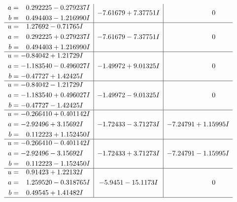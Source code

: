 \documentclass[1p]{elsarticle_modified}
\theoremstyle{definition}
\begin{document}
$$\begin{array}{c|c|c}
\begin{aligned}
a &= \phantom{-}0.292225 - 0.279237 I \\
b &= \phantom{-}0.494403 - 1.216990 I\end{aligned}
 & -7.61679 + 7.37751 I & \phantom{-0.000000 } 0 \\ \hline\begin{aligned}
u &= \phantom{-}1.27692 - 0.71765 I \\
a &= \phantom{-}0.292225 + 0.279237 I \\
b &= \phantom{-}0.494403 + 1.216990 I\end{aligned}
 & -7.61679 - 7.37751 I & \phantom{-0.000000 } 0 \\ \hline\begin{aligned}
u &= -0.84042 + 1.21729 I \\
a &= -1.183540 - 0.496027 I \\
b &= -0.47727 + 1.42425 I\end{aligned}
 & -1.49972 + 9.01325 I & \phantom{-0.000000 } 0 \\ \hline\begin{aligned}
u &= -0.84042 - 1.21729 I \\
a &= -1.183540 + 0.496027 I \\
b &= -0.47727 - 1.42425 I\end{aligned}
 & -1.49972 - 9.01325 I & \phantom{-0.000000 } 0 \\ \hline\begin{aligned}
u &= -0.266410 + 0.401142 I \\
a &= -2.92496 + 3.15692 I \\
b &= \phantom{-}0.112223 + 1.152450 I\end{aligned}
 & -1.72433 - 3.71273 I & -7.24791 + 1.15995 I \\ \hline\begin{aligned}
u &= -0.266410 - 0.401142 I \\
a &= -2.92496 - 3.15692 I \\
b &= \phantom{-}0.112223 - 1.152450 I\end{aligned}
 & -1.72433 + 3.71273 I & -7.24791 - 1.15995 I \\ \hline\begin{aligned}
u &= \phantom{-}0.91423 + 1.22132 I \\
a &= \phantom{-}1.259520 - 0.318765 I \\
b &= \phantom{-}0.49545 + 1.41482 I\end{aligned}
 & -5.9451 - 15.1173 I & \phantom{-0.000000 } 0\\
 \hline 
 \end{array}$$\newpage$$\begin{array}{c|c|c}  

\end{array}$$
\end{document}
